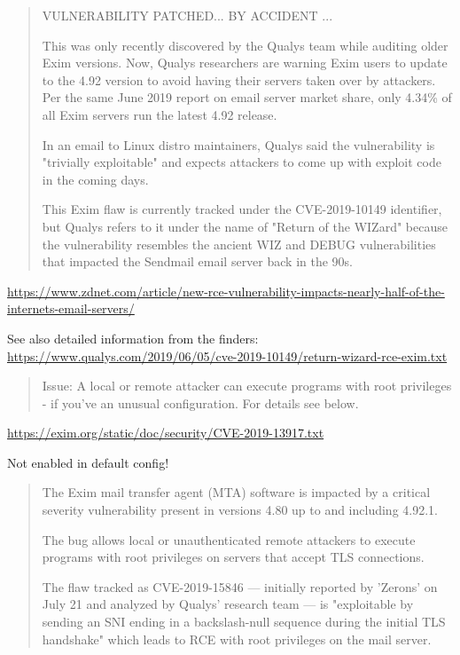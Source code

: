 \documentclass[Screen16to9,17pt]{foils}
\begin{document}
\begin{quote}
  VULNERABILITY PATCHED... BY ACCIDENT
...

This was only recently discovered by the Qualys team while auditing older Exim versions. Now, Qualys researchers are warning Exim users to update to the 4.92 version to avoid having their servers taken over by attackers. Per the same June 2019 report on email server market share, only 4.34\% of all Exim servers run the latest 4.92 release.

In an email to Linux distro maintainers, Qualys said the vulnerability is "trivially exploitable" and expects attackers to come up with exploit code in the coming days.

This Exim flaw is currently tracked under the CVE-2019-10149 identifier, but Qualys refers to it under the name of "Return of the WIZard" because the vulnerability resembles the ancient WIZ and DEBUG vulnerabilities that impacted the Sendmail email server back in the 90s.
\end{quote}

{\footnotesize\url{https://www.zdnet.com/article/new-rce-vulnerability-impacts-nearly-half-of-the-internets-email-servers/}}

See also detailed information from the finders:\\ \url{https://www.qualys.com/2019/06/05/cve-2019-10149/return-wizard-rce-exim.txt}



\begin{quote}
Issue:      A local or remote attacker can execute programs with root
            privileges - if you've an unusual configuration. For details
	    see below.
\end{quote}

\url{https://exim.org/static/doc/security/CVE-2019-13917.txt}

Not enabled in default config!


\begin{quote}
The Exim mail transfer agent (MTA) software is impacted by a critical severity vulnerability present in versions 4.80 up to and including 4.92.1.

The bug allows local or unauthenticated remote attackers to execute programs with root privileges on servers that accept TLS connections.

The flaw tracked as CVE-2019-15846 — initially reported by 'Zerons' on July 21 and analyzed by Qualys' research team — is "exploitable by sending an SNI ending in a backslash-null sequence during the initial TLS handshake" which leads to RCE with root privileges on the mail server.
\end{quote}
\end{document}
